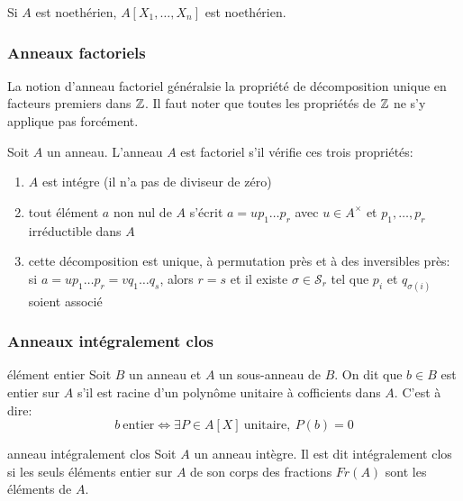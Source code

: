 \begin{corollary}{}{}
    Si $A$ est noethérien, $A[X_1,\dots,X_n]$ est noethérien.
\end{corollary}




\subsubsection{Anneaux factoriels}

La notion d'anneau factoriel généralsie la propriété de décomposition unique en facteurs premiers dans $\mathbb{Z}$.
Il faut noter que toutes les propriétés de $\mathbb{Z}$ ne s'y applique pas forcément. 

\begin{definition}{}{}
    Soit $A$ un anneau. L'anneau $A$ est factoriel s'il vérifie ces trois propriétés:
    \begin{enumerate}[(1)]
        \item $A$ est intégre (il n'a pas de diviseur de zéro)
        \item tout élément $a$ non nul de $A$ s'écrit $a = u p_1 \dots p_r$ avec $u \in A^\times$
              et $p_1, \dots, p_r$ irréductible dans $A$
        \item cette décomposition est unique, à permutation près et à des inversibles près:
              si $a = u p_1 \dots p_r = v q_1 \dots q_s$, alors $r = s$ 
              et il existe $\sigma \in \mathscr{S}_r$ tel que $p_i$ et $q_{\sigma(i)}$ soient associé
    \end{enumerate}
\end{definition}




\subsubsection{Anneaux intégralement clos}

\begin{definition}{élément entier}{}
    Soit $B$ un anneau et $A$ un sous-anneau de $B$. On dit que $b \in B$ est entier sur $A$ s'il est racine d'un polynôme unitaire à cofficients dans $A$.
    C'est à dire:
    \[ b ~ \text{entier} \Longleftrightarrow \exists P \in A[X] ~ \text{unitaire}, ~ P(b) = 0 \]
\end{definition}

\begin{proposition}{anneau intégralement clos}{}
    Soit $A$ un anneau intègre. Il est dit intégralement clos si les seuls éléments entier sur $A$ de son corps des fractions $Fr(A)$ sont les éléments de $A$.
\end{proposition}

